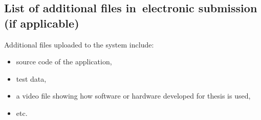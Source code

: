 \documentclass[a4paper,twoside,12pt]{book}
\begin{document}
\begin{appendices}
\chapter{List of additional files in~electronic submission (if applicable)}


Additional files uploaded to the system include:
\begin{itemize}
\item source code of the application,
\item test data,
\item a video file showing how software or hardware developed for thesis is used,
\item etc.
\end{itemize}

\listoffigures
{}
\listoftables
{}

\end{appendices}
\end{document}
